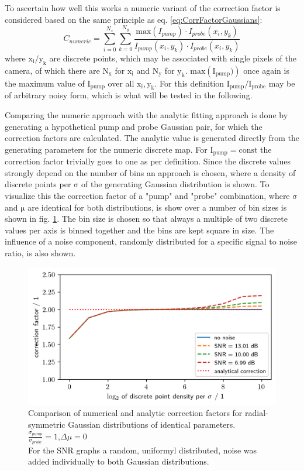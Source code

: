 \documentclass[twoside,openright]{scrreprt}
\begin{document}
{To ascertain how well this works a numeric variant of the correction factor is considered based on the same principle as eq. \ref{eq:CorrFactorGaussians}:
\begin{equation*}
C_{numeric} = \sum_{i=0}^{N_x}\sum_{k=0}^{N_y}\frac{\mathrm{max}\left(I_{pump}\right)\cdot I_{probe}(x_i,y_k)}{I_{pump}(x_i,y_k)\cdot I_{probe}(x_i,y_k)}
\end{equation*}
where $\mathrm{x_i/y_k}$ are discrete points, which may be associated with single pixels of the camera, of which there are $\mathrm{N_x}$ for $\mathrm{x_i}$ and $\mathrm{N_y}$ for $\mathrm{y_k}$. $\mathrm{max\left(I_{pump})\right)}$ once again is the maximum value of $\mathrm{I_{pump}}$ over all $\mathrm{x_i, y_k}$. For this definition $\mathrm{I_{pump}/I_{probe}}$ may be of arbitrary noisy form, which is what will be tested in the following.

Comparing the numeric approach with the analytic fitting approach is done by generating a hypothetical pump and probe Gaussian pair, for which the correction factors are calculated. The analytic value is generated directly from the generating parameters for the numeric discrete map. For $\mathrm{I_{pump} = const}$ the correction factor trivially goes to one as per definition. Since the discrete values strongly depend on the number of bins an approach is chosen, where a density of discrete points per $\mathrm{\sigma}$ of the generating Gaussian distribution is shown. To visualize this the correction factor of a "pump" and "probe" combination, where $\mathrm{\sigma}$ and $\mathrm{\mu}$ are identical for both distributions, is show over a number of bin sizes is shown in fig. \ref{fig:NumericalCorrectionSNR}. The bin size is chosen so that always a multiple of two discrete values per axis is binned together and the bins are kept square in size. The influence of a noise component, randomly distributed for a specific signal to noise ratio, is also shown.

\begin{figure}[h]
\centering
\includegraphics[scale = 1]{images/NumericalCorrectionSNR.png}
\caption{Comparison of numerical and analytic correction factors for radial-symmetric Gaussian distributions of identical parameters. \\$\frac{\sigma_{pump}}{\sigma_{probe}}=1$,$\Delta\mu = 0$\\For the SNR graphs a random, uniformyl distributed, noise was added individually to both Gaussian distributions.\label{fig:NumericalCorrectionSNR}}
\end{figure}

}
\end{document}
